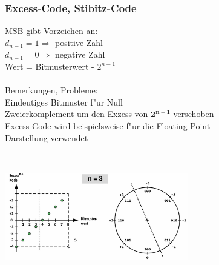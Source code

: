\subsubsection{Excess-Code, Stibitz-Code}
\begin{minipage}{9cm}
	\begin{tabbing}
		MS\=B gibt  Vorzeichen an:\\
		\> $d_{n-1} = 1 \Rightarrow$ positive Zahl\\
		\> $d_{n-1} = 0 \Rightarrow$ negative Zahl\\
		Wert = Bitmusterwert - $2^{n-1}$\\\\
		Bemerkungen, Probleme:\\
		\> Eindeutiges Bitmuster f"ur Null\\
		\> Zweierkomplement um den Exzess von $\mathbf{2^{n-1}}$ verschoben\\
		\> Excess-Code wird beispielsweise f"ur die Floating-Point \\
		\> Darstellung verwendet	
	\end{tabbing}
\end{minipage}
%
\begin{minipage}{0.5cm}
	\ \
\end{minipage}
%
\begin{minipage}{9cm}
	\includegraphics[width=8cm]{pics/Excess_Code}
\end{minipage}

